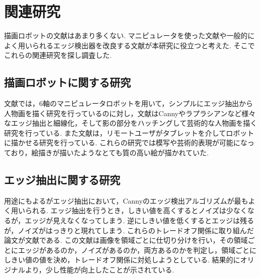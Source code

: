 \chapter{関連研究}
  \label{chap:related}
  
  描画ロボットの文献はあまり多くない. マニピュレータを使った文献や一般的によく用いられるエッジ検出器を改良する文献が本研究に役立つと考えた. そこでこれらの関連研究を探し調査した.   
	
  \section{描画ロボットに関する研究}
    \label{sec:related_reasearch}
	文献\cite{1}では，6軸のマニピュレータロボットを用いて，シンプルにエッジ抽出から人物画を描く研究を行っているのに対し，文献\cite{2}はCannyやラプラシアンなど様々なエッジ抽出と細線化，そして影の部分をハッチングして芸術的な人物画を描く研究を行っている. また文献\cite{3}は，リモートユーザがタブレットを介してロボットに描かせる研究を行っている. これらの研究では模写や芸術的表現が可能になっており，絵描きが描いたようなとても質の高い絵が描かれていた.


  \section{エッジ抽出に関する研究}
    \label{sec:edged_detection_research}
	用途にもよるがエッジ抽出において，Cannyのエッジ検出アルゴリズムが最もよく用いられる.
	エッジ抽出を行うとき，しきい値を高くするとノイズは少なくなるが，エッジが見えなくなってしまう. 逆にしきい値を低くするとエッジは残るが，ノイズがはっきりと現れてしまう. これらのトレードオフ関係に取り組んだ論文が文献\cite{4}である. この文献は画像を領域ごとに仕切り分けを行い，その領域ごとにエッジがあるのか，ノイズがあるのか，両方あるのかを判定し，領域ごとにしきい値の値を決め，トレードオフ関係に対処しようとしている. 結果的にオリジナルより，少し性能が向上したことが示されている.



